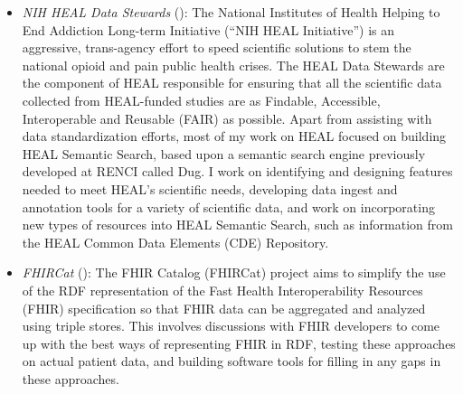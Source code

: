 \begin{itemize}
\begin{products}




\end{products}

\item \textit{NIH HEAL Data Stewards} (): The National Institutes of Health Helping to End Addiction Long-term Initiative (``NIH HEAL Initiative'') is an aggressive, trans-agency effort to speed scientific solutions to stem the national opioid and pain public health crises. The HEAL Data Stewards are the component of HEAL responsible for ensuring that all the scientific data collected from HEAL-funded studies are as Findable, Accessible, Interoperable and Reusable (FAIR) as possible. Apart from assisting with data standardization efforts, most of my work on HEAL focused on building HEAL Semantic Search, based upon a semantic search engine previously developed at RENCI called Dug. I work on identifying and designing features needed to meet HEAL's scientific needs, developing data ingest and annotation tools for a variety of scientific data, and work on incorporating new types of resources into HEAL Semantic Search, such as information from the HEAL Common Data Elements (CDE) Repository.

\begin{products}


\end{products}

\item \textit{FHIRCat} (): The FHIR Catalog (FHIRCat) project aims to simplify the use of the RDF representation of the Fast Health Interoperability Resources (FHIR) specification so that FHIR data can be aggregated and analyzed using triple stores. This involves discussions with FHIR developers to come up with the best ways of representing FHIR in RDF, testing these approaches on actual patient data, and building software tools for filling in any gaps in these approaches.


\end{itemize}
